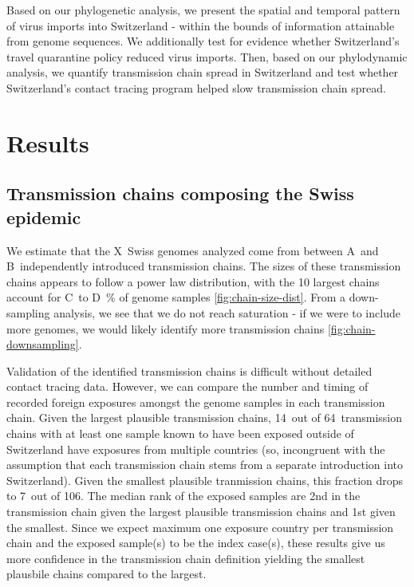 \documentclass[9pt,twocolumn,twoside,lineno]{pnas-new}
\newcommand\nswissseqs{X}
\newcommand\nchainsmin{A}
\newcommand\nchainsmax{B}
\newcommand\minlargestchainsper{C}
\newcommand\maxlargestchainsper{D}
\newcommand\ncinongruentexposurechainsmax{7}
\newcommand\nexposurechainsmax{106}
\newcommand\ncinongruentexposurechainsmin{14}
\newcommand\nexposurechainsmin{64}
\newcommand\rankexpsamplemin{2}
\newcommand\rankexpsamplemax{1}
\begin{document}
Based on our phylogenetic analysis, we present the spatial and temporal pattern of virus imports into Switzerland - within the bounds of information attainable from genome sequences. We additionally test for evidence whether Switzerland’s travel quarantine policy reduced virus imports. Then, based on our phylodynamic analysis, we quantify transmission chain spread in Switzerland and test whether Switzerland’s contact tracing program helped slow transmission chain spread.

\section{Results}

\subsection{Transmission chains composing the Swiss epidemic}

We estimate that the \nswissseqs\ Swiss genomes analyzed come from between \nchainsmin\ and \nchainsmax\ independently introduced transmission chains. The sizes of these transmission chains appears to follow a power law distribution, with the 10 largest chains account for \minlargestchainsper\ to \maxlargestchainsper\ \% of genome samples \ref{fig:chain-size-dist}. From a down-sampling analysis, we see that we do not reach saturation - if we were to include more genomes, we would likely identify more transmission chains \ref{fig:chain-downsampling}. 

Validation of the identified transmission chains is difficult without detailed contact tracing data. However, we can compare the number and timing of recorded foreign exposures amongst the genome samples in each transmission chain. Given the largest plausible transmission chains, \ncinongruentexposurechainsmin\ out of \nexposurechainsmin\ transmission chains with at least one sample known to have been exposed outside of Switzerland have exposures from multiple countries (so, incongruent with the assumption that each transmission chain stems from a separate introduction into Switzerland). Given the smallest plausible tranmission chains, this fraction drops to \ncinongruentexposurechainsmax\ out of \nexposurechainsmax. The median rank of the exposed samples are  \rankexpsamplemin nd in the transmission chain given the largest plausible transmission chains and \rankexpsamplemax st given the smallest. Since we expect maximum one exposure country per transmission chain and the exposed sample(s) to be the index case(s), these results give us more confidence in the transmission chain definition yielding the smallest plausbile chains compared to the largest.
\end{document}
